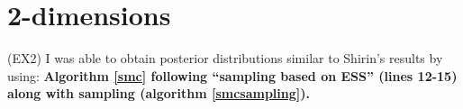 \documentclass{sfuthesis}
\begin{document}
\begin{itemize}
\begin{enumerate}
  \end{enumerate}

\end{itemize}


\section{2-dimensions}

(EX2) I was able to obtain posterior distributions similar to Shirin's results by using: \textbf{Algorithm \ref{smc} following ``sampling based on ESS'' (lines 12-15) along with sampling (algorithm \ref{smcsampling}).}

\bigskip
\end{document}
